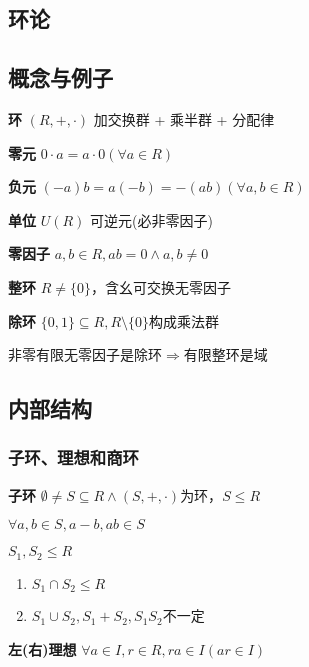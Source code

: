 \documentclass[a4paper,10pt]{ctexart}
\newcommand*{\impl}{\Rightarrow}
\renewcommand*{\leq}{\leqslant}
\begin{document}
\begin{multicols}{3}
    \section{环论}

    \subsection{概念与例子}

    \textbf{环} $(R, +, \cdot)$ 加交换群 + 乘半群 + 分配律

    \textbf{零元} $0 \cdot a = a \cdot 0 (\forall a \in R)$

    \textbf{负元} $(-a)b = a(-b) = -(ab) (\forall a, b \in R)$

    \textbf{单位} $U(R)$ 可逆元(必非零因子)

    \textbf{零因子} $a, b \in R, ab = 0 \wedge a, b \ne 0$

    \textbf{整环} $R\ne \{0\}$，含幺可交换无零因子

    \textbf{除环} $\{0, 1\} \subseteq R, R \setminus \{0\}$构成乘法群

    非零有限无零因子是除环$\!\impl\!$有限整环是域

    \subsection{内部结构}

    \subsubsection{子环、理想和商环}

    \textbf{子环} $\emptyset \!\neq\! S \!\subseteq\! R \wedge (S, +, \cdot)$为环，$S \leq R$

    \begin{theorem}[子环判则]
        $\forall a, b \in S, a - b, ab \in S$
    \end{theorem}

    \begin{theorem}[子环运算律]
        $S_1, S_2 \leq R$
        \begin{enumerate}
            \item $S_1 \cap S_2 \leq R$
            \item $S_1 \cup S_2, S_1 + S_2, S_1S_2$不一定
        \end{enumerate}
    \end{theorem}

    \textbf{左(右)理想} $\forall a \in I, r \in R, ra \in I (ar \in I)$


\end{multicols}
\end{document}
